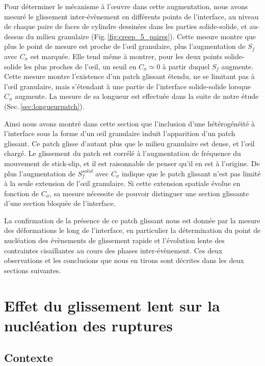 Pour déterminer le mécanisme à l'œuvre dans cette augmentation, nous avons mesuré le glissement inter-évènement en différents points de l'interface, au niveau de chaque paire de faces de cylindre dessinées dans les parties solide-solide, et au-dessus du milieu granulaire (Fig.\,\ref{fig:creep_5_paires}). Cette mesure montre que plus le point de mesure est proche de l'œil granulaire, plus l'augmentation de $S_f$ avec $C_\sigma$ est marquée. Elle tend même à montrer, pour les deux points solide-solide les plus proches de l'œil, un seuil en $C_\sigma\simeq 0$ à partir duquel $S_f$ augmente. Cette mesure montre l'existence d'un patch glissant étendu, ne se limitant pas à l'œil granulaire, mais s'étendant à une partie de l'interface solide-solide lorsque $C_\sigma$ augmente. La mesure de sa longueur est effectuée dans la suite de notre étude (Sec.\,\ref{sec:longueurpatch}).


Ainsi nous avons montré dans cette section que l'inclusion d'une hétérogénéité à l'interface sous la forme d'un œil granulaire induit l'apparition d'un patch glissant. Ce patch glisse d'autant plus que le milieu granulaire est dense, et l'œil chargé. Le glissement du patch est corrélé à l'augmentation de fréquence du mouvement de stick-slip, et il est raisonnable de penser qu'il en est à l'origine. De plus l'augmentation de $S_f^{solid}$ avec $C_\sigma$ indique que le patch glissant n'est pas limité à la seule extension de l'œil granulaire. Si cette extension spatiale évolue en fonction de $C_\sigma$, sa mesure nécessite de pouvoir distinguer une section glissante d'une section bloquée de l'interface.



La confirmation de la présence de ce patch glissant nous est donnée par la mesure des déformations le long de l'interface, en particulier la détermination du point de nucléation des évènements de glissement rapide et l'évolution lente des contraintes cisaillantes au cours des phases inter-évènement. Ces deux observations et les conclusions que nous en tirons sont décrites dans les deux sections suivantes.




\section{Effet du glissement lent sur la nucléation des ruptures}

\subsection{Contexte}
\label{sec:nuccontexte}

